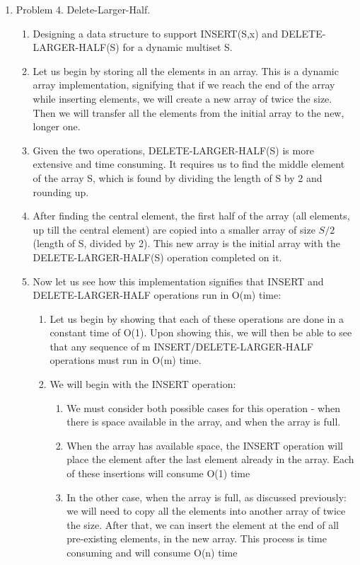 \documentclass[11pt]{article}
\begin{document}
\begin{enumerate}
\item Problem 4. Delete-Larger-Half.
    \begin{enumerate}
        \item Designing a data structure to support INSERT(S,x) and DELETE-LARGER-HALF(S) for a dynamic multiset S.
        \item Let us begin by storing all the elements in an array. This is a dynamic array implementation, signifying that if we reach the end of the array while inserting elements, we will create a new array of twice the size. Then we will transfer all the elements from the initial array to the new, longer one. 
        \item Given the two operations, DELETE-LARGER-HALF(S) is more extensive and time consuming. It requires us to find the middle element of the array S, which is found by dividing the length of S by 2 and rounding up. 
        \item After finding the central element, the first half of the array (all elements, up till the central element) are copied into a smaller array of size $S/2$ (length of S, divided by 2). This new array is the initial array with the DELETE-LARGER-HALF(S) operation completed on it.
        \item Now let us see how this implementation signifies that INSERT and DELETE-LARGER-HALF operations run in O(m) time:
        \begin{enumerate}
            \item Let us begin by showing that each of these operations are done in a constant time of O(1). Upon showing this, we will then be able to see that any sequence of m INSERT/DELETE-LARGER-HALF operations must run in O(m) time.
            \item We will begin with the INSERT operation:
                \begin{enumerate}
                    \item We must consider both possible cases for this operation - when there is space available in the array, and when the array is full.
                    \item When the array has available space, the INSERT operation will place the element after the last element already in the array. Each of these insertions will consume O(1) time
                    \item In the other case, when the array is full, as discussed previously: we will need to copy all the elements into another array of twice the size. After that, we can insert the element at the end of all pre-existing elements, in the new array. This process is time consuming and will consume O(n) time

\end{enumerate}
\end{enumerate}
\end{enumerate}
\end{enumerate}
\end{document}
